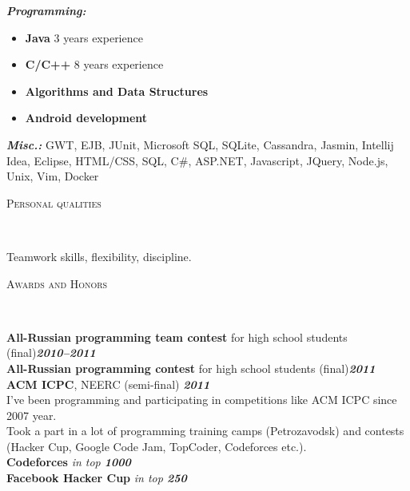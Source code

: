 \documentclass[12pt]{article}
\newenvironment{changemargin}[2]{%
  \begin{list}{}{%
    \setlength{\topsep}{0pt}%
    \setlength{\leftmargin}{#1}%
    \setlength{\rightmargin}{#2}%
    \setlength{\listparindent}{\parindent}%
    \setlength{\itemindent}{\parindent}%
    \setlength{\parsep}{\parskip}%
  }%
  \item[]}{\end{list}
}
\newcommand{\lineover}{
	\begin{changemargin}{-0.05in}{-0.05in}
		\vspace*{-8pt}
		\hrulefill \\
		\vspace*{-2pt}
	\end{changemargin}
}
\newcommand{\header}[1]{
	\begin{changemargin}{-0.5in}{-0.5in}
		\scshape{#1}\\
  	\lineover
	\end{changemargin}
}
\newenvironment{body} {
	\vspace*{-16pt}
	\begin{changemargin}{-0.25in}{-0.5in}
  }	
	{\end{changemargin}
}
\begin{document}
\begin{body}
	\vspace{14pt}
	\emph{\textbf{Programming:}}{}
	\begin{itemize}
		\item \textbf{Java} 3 years experience
		\item \textbf{C/C++} 8 years experience
		\item \textbf{Algorithms and Data Structures}
		\item \textbf{Android development} 
	\end{itemize}
	\emph{\textbf{Misc.:}}{} GWT, EJB, JUnit, Microsoft SQL, SQLite, Cassandra, Jasmin, Intellij Idea, Eclipse, HTML/CSS, SQL, C\#, ASP.NET, Javascript, JQuery, Node.js, Unix, Vim, Docker
\end{body}

\vspace{14pt}
\smallskip

\header{Personal qualities}

\begin{body}
	\vspace{14pt}
	Teamwork skills, flexibility, discipline.
\end{body}

\smallskip

\header{Awards and Honors}

\begin{body}
	\vspace{14pt}
	\textbf{All-Russian programming team contest} for high school students (final)\hfill \emph{\textbf{2010--2011}}\\
	\smallskip
	\textbf{All-Russian programming contest} for high school students (final)\hfill \emph{\textbf{2011}}\\
	\smallskip
	\textbf{ACM ICPC}, NEERC (semi-final) \hfill{} \emph{\textbf{2011}}\\
	\smallskip
	\vspace{14pt}
	I've been programming and participating in competitions like ACM ICPC since 2007 year. \\
	Took a part in a lot of programming training camps (Petrozavodsk) and contests (Hacker Cup, Google Code Jam, TopCoder, Codeforces etc.).\\
	\smallskip
	\textbf{Codeforces} \hfill{} \emph{in top \textbf{1000}}\\
	\smallskip
	\textbf{Facebook Hacker Cup} \hfill{} \emph{in top \textbf{250}}\\
	\smallskip
\end{body}
\end{document}
